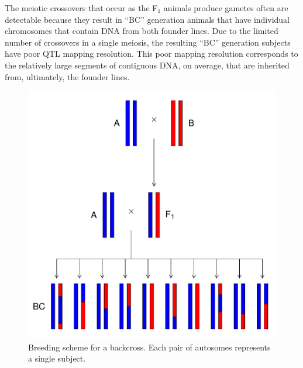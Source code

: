 \documentclass[oneside]{book}\usepackage[]{graphicx}\usepackage[]{color}
\makeatletter
\def\maxwidth{ %
  \ifdim\Gin@nat@width>\linewidth
    \linewidth
  \else
    \Gin@nat@width
  \fi
}
\newenvironment{knitrout}{}{} %
\makeatother
\begin{document}
The meiotic crossovers that occur as the F$_1$ animals produce gametes often
are detectable because they result in ``BC'' generation animals that have individual
chromosomes that contain DNA from both founder lines. Due to the limited number
of crossovers in a single meiosis, the resulting ``BC'' generation subjects have
poor QTL mapping resolution. This poor mapping resolution corresponds to the relatively large segments of contiguous DNA, on average, that are inherited from, ultimately, the founder lines.








\begin{knitrout}
\color{fgcolor}\begin{figure}
\includegraphics[width=\maxwidth]{figure/backcross-1} \caption[Breeding scheme for a backcross]{Breeding scheme for a backcross. Each pair of autosomes represents a single subject.}\label{fig:backcross}
\end{figure}


\end{knitrout}
\end{document}
